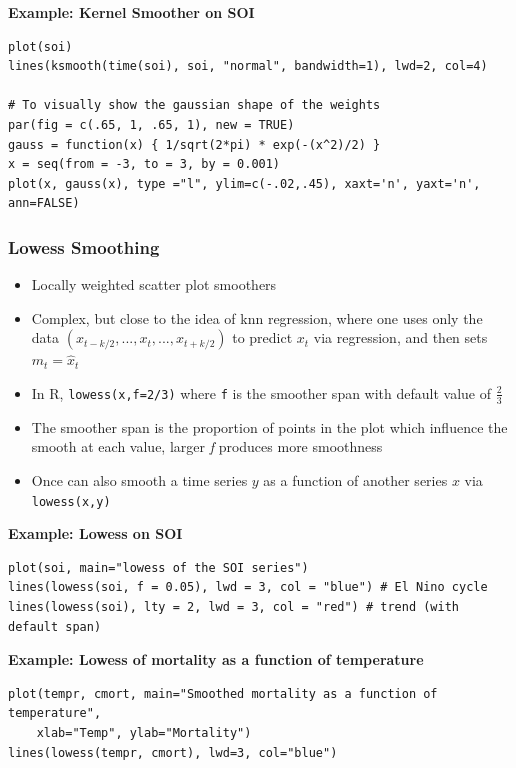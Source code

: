 \documentclass[11pt]{article}
\newcommand{\noi}{\noindent}
\begin{document}
\noi \textbf{Example: Kernel Smoother on SOI}
\begin{lstlisting}
plot(soi)
lines(ksmooth(time(soi), soi, "normal", bandwidth=1), lwd=2, col=4)

# To visually show the gaussian shape of the weights
par(fig = c(.65, 1, .65, 1), new = TRUE)
gauss = function(x) { 1/sqrt(2*pi) * exp(-(x^2)/2) }
x = seq(from = -3, to = 3, by = 0.001)
plot(x, gauss(x), type ="l", ylim=c(-.02,.45), xaxt='n', yaxt='n', ann=FALSE)
\end{lstlisting}

\subsubsection*{Lowess Smoothing}
\begin{itemize}
    \item Locally weighted scatter plot smoothers
    \item Complex, but close to the idea of knn regression, where one uses only the data $(x_{t-k/2},...,x_t,...,x_{t+k/2})$ to predict $x_t$ via regression, and then sets $m_t = \hat x_t$
    \item In R, \texttt{lowess(x,f=2/3)} where \texttt{f} is the smoother span with default value of $\frac{2}{3}$
    \item The smoother span is the proportion of points in the plot which influence the smooth at each value, larger \textit{f} produces more smoothness
    \item Once can also smooth a time series $y$ as a function of another series $x$ via \texttt{lowess(x,y)}
\end{itemize} \phantom{i}

\noi \textbf{Example: Lowess on SOI}
\begin{lstlisting}
plot(soi, main="lowess of the SOI series")
lines(lowess(soi, f = 0.05), lwd = 3, col = "blue") # El Nino cycle
lines(lowess(soi), lty = 2, lwd = 3, col = "red") # trend (with default span)
\end{lstlisting}

\noi \textbf{Example: Lowess of mortality as a function of temperature}
\begin{lstlisting}
plot(tempr, cmort, main="Smoothed mortality as a function of temperature",
    xlab="Temp", ylab="Mortality")
lines(lowess(tempr, cmort), lwd=3, col="blue")
\end{lstlisting}
\end{document}
